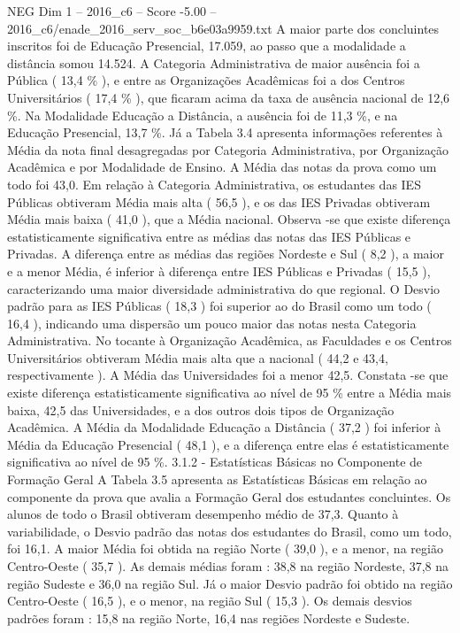 \begin{textsample}{NEG Dim 1 – 2016\_c6 – Score -5.00 – 2016\_c6/enade\_2016\_serv\_soc\_b6e03a9959.txt}
A maior parte dos concluintes inscritos foi de Educação Presencial, 17.059, ao passo que a modalidade a distância somou 14.524.
A Categoria Administrativa de maior ausência foi a Pública ( 13,4 \% ), e entre as Organizações Acadêmicas foi a dos Centros Universitários ( 17,4 \% ), que ficaram acima da taxa de ausência nacional de 12,6 \%.
Na Modalidade Educação a Distância, a ausência foi de 11,3 \%, e na Educação Presencial, 13,7 \%.
Já a Tabela 3.4 apresenta informações referentes à Média da nota final desagregadas por Categoria Administrativa, por Organização Acadêmica e por Modalidade de Ensino.
A Média das notas da prova como um todo foi 43,0.
Em relação à Categoria Administrativa, os estudantes das IES Públicas obtiveram Média mais alta ( 56,5 ), e os das IES Privadas obtiveram Média mais baixa ( 41,0 ), que a Média nacional.
Observa -se que existe diferença estatisticamente significativa entre as médias das notas das IES Públicas e Privadas.
A diferença entre as médias das regiões Nordeste e Sul ( 8,2 ), a maior e a menor Média, é inferior à diferença entre IES Públicas e Privadas ( 15,5 ), caracterizando uma maior diversidade administrativa do que regional.
O Desvio padrão para as IES Públicas ( 18,3 ) foi superior ao do Brasil como um todo ( 16,4 ), indicando uma dispersão um pouco maior das notas nesta Categoria Administrativa.
No tocante à Organização Acadêmica, as Faculdades e os Centros Universitários obtiveram Média mais alta que a nacional ( 44,2 e 43,4, respectivamente ).
A Média das Universidades foi a menor 42,5.
Constata -se que existe diferença estatisticamente significativa ao nível de 95 \% entre a Média mais baixa, 42,5 das Universidades, e a dos outros dois tipos de Organização Acadêmica.
A Média da Modalidade Educação a Distância ( 37,2 ) foi inferior à Média da Educação Presencial ( 48,1 ), e a diferença entre elas é estatisticamente significativa ao nível de 95 \%. 3.1.2 - Estatísticas Básicas no Componente de Formação Geral A Tabela 3.5 apresenta as Estatísticas Básicas em relação ao componente da prova que avalia a Formação Geral dos estudantes concluintes.
Os alunos de todo o Brasil obtiveram desempenho médio de 37,3.
Quanto à variabilidade, o Desvio padrão das notas dos estudantes do Brasil, como um todo, foi 16,1.
A maior Média foi obtida na região Norte ( 39,0 ), e a menor, na região Centro-Oeste ( 35,7 ).
As demais médias foram : 38,8 na região Nordeste, 37,8 na região Sudeste e 36,0 na região Sul.
Já o maior Desvio padrão foi obtido na região Centro-Oeste ( 16,5 ), e o menor, na região Sul ( 15,3 ).
Os demais desvios padrões foram : 15,8 na região Norte, 16,4 nas regiões Nordeste e Sudeste.

\end{textsample}
